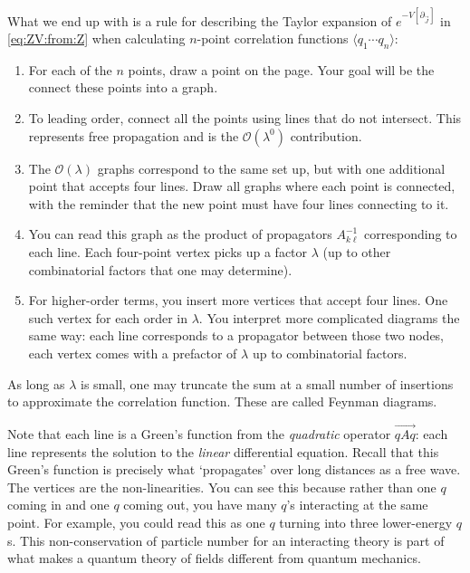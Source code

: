 What we end up with is a rule for describing the Taylor expansion of $e^{-V[\partial_{\vec{J}}]}$ in \eqref{eq:ZV:from:Z} when calculating $n$-point correlation functions $\langle q_1\cdots q_n\rangle$:
\begin{enumerate}
\item For each of the $n$ points, draw a point on the page. Your goal will be the connect these points into a graph.

\item To leading order, connect all the points using lines that do not intersect. This represents free propagation and is the $\mathcal O(\lambda^0)$ contribution.

\item The $\mathcal O(\lambda)$ graphs correspond to the same set up, but with one additional point that accepts four lines. Draw all graphs where each point is connected, with the reminder that the new point must have four lines connecting to it.

\item You can read this graph as the product of propagators $A^{-1}_{k\ell}$ corresponding to each line. Each four-point vertex picks up a factor $\lambda$ (up to other combinatorial factors that one may determine).

\item For higher-order terms, you insert more vertices that accept four lines. One such vertex for each order in $\lambda$. You interpret more complicated diagrams the same way: each line corresponds to a propagator between those two nodes, each vertex comes with a prefactor of $\lambda$ up to combinatorial factors.
\end{enumerate}
As long as $\lambda$ is small, one may truncate the sum at a small number of insertions to approximate the correlation function. These are called Feynman diagrams.

Note that each line is a Green's function from the \emph{quadratic} operator $\vec{qAq}$: each line represents the solution to the \emph{linear} differential equation. Recall that this Green's function is precisely what `propagates' over long distances as a free wave. The vertices are the non-linearities. You can see this because rather than one $q$ coming in and one $q$ coming out, you have many $q$'s interacting at the same point. For example, you could read this as one $q$ turning into three lower-energy $q$s. This non-conservation of particle number for an interacting theory is part of what makes a quantum theory of fields different from quantum mechanics. 

